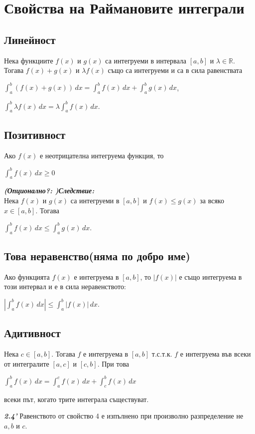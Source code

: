 \documentclass[11pt]{article} %
\newcommand{\italicBold}[1]{\textbf{\emph{#1}}}
\newcommand{\integral}[4]{\displaystyle \int_{#1}^{#2}#3\,#4}
\begin{document}
\section{Свойства на Раймановите интеграли}
\subsection{Линейност}
Нека функциите $f(x)$ и $g(x)$ са интегруеми в интервала $[a,b]$ и $\lambda \in \mathbb{R}$. Тогава $f(x)+g(x)$ и $\lambda f(x)$ също са интегруеми и са в сила равенствата \\
\centerline{$\integral{a}{b}{(f(x)+g(x))}{dx}=\integral{a}{b}{f(x)}{dx}+\integral{a}{b}{g(x)}{dx}$,}
\centerline{$\integral{a}{b}{\lambda f(x)}{dx} = \lambda \integral{a}{b}{f(x)}{dx}$.}

\subsection{Позитивност}
Ако $f(x)$ е неотрицателна интегруема функция, то \\
\centerline{$\integral{a}{b}{f(x)}{dx} \geq 0$}

\italicBold{(Опционално?: )Следствие: }\\
Нека $f(x)$ и $g(x)$ са интегруеми в $[a,b]$ и $f(x)\leq g(x)$
за всяко $x \in [a,b]$. Тогава\\
\centerline{$\integral{a}{b}{f(x)}{dx} \leq \integral{a}{b}{g(x)}{dx}$.}

\subsection{Това неравенство(няма по добро име)}
Ако функцията $f(x)$ е интегруема в $[a,b]$, то $|f(x)|$ е също интегруема в този интервал и е в сила неравенството: \\
\centerline{$|\integral{a}{b}{f(x)}{dx}| \leq \integral{a}{b}{|f(x)|}{dx}$.}

\subsection{Адитивност}
Нека $c \in [a,b]$. Тогава $f$ е интегруема в $[a,b]$ т.с.т.к. $f$ е интегруема във всеки от интегралите $[a,c]$ и $[c,b]$. При това\\
\centerline{$\integral{a}{b}{f(x)}{dx}=\integral{a}{c}{f(x)}{dx} + \integral{c}{b}{f(x)}{dx}$}
всеки път, когато трите интеграла съществуват.

\italicBold{2.4'} Равенството от свойство 4 е изпълнено при произволно разпределение не $a, b$ и $c$.
\end{document}
